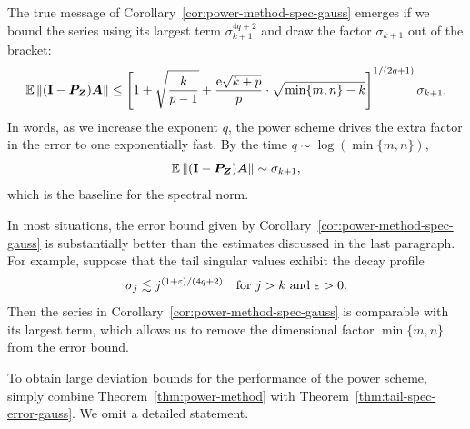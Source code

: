 \documentclass[final]{siamltex}
\newcommand{\notate}[1]{\textcolor{red}{\textbf{[#1]}}}
\begin{document}
\lsp

The true message of Corollary~\ref{cor:power-method-spec-gauss}
emerges if we bound the series using its largest term $\sigma_{k+1}^{4q+2}$
and draw the factor $\sigma_{k+1}$ out of the bracket:
\begin{equation*} \label{eqn:power-method-weak-bd}
\Expect \norm{(\Id - \mtx{P}_{\mtx{Z}}) \mtx{A}}
    \leq \left[ 1 + \sqrt{\frac{k}{p-1}}
    + \frac{\econst\sqrt{k+p}}{p} \cdot \sqrt{ \min\{m,n\} - k } \right]^{1/(2q+1)}
    \sigma_{k+1}.
\end{equation*}
In words, as we increase the exponent $q$, the power scheme drives
the extra factor in the error to one exponentially fast.
By the time $q \sim \log\left( \min\{m,n\} \right)$,
$$
\operatorname{\mathbb{E}} \left\Vert {(\mathbf{I}- \bm{P}_{\bm{Z}}) \bm{A}} \right\Vert
    \sim \sigma_{k+1},
$$
which is the baseline for the spectral norm.

In most situations, the error bound given by Corollary~\ref{cor:power-method-spec-gauss} is substantially better than the estimates discussed in the last paragraph.  For example, suppose that the tail singular values exhibit the decay profile
$$
\sigma_j \lesssim j^{(1+\varepsilon)/(4q+2)}
\quad\text{for $j > k$ and $\varepsilon > 0$}.
$$
Then the series in Corollary~\ref{cor:power-method-spec-gauss} is comparable with its largest term, which allows us to remove the dimensional factor $\min\{m,n\}$ from the error bound.




To obtain large deviation bounds for the performance of the power scheme,
simply combine Theorem~\ref{thm:power-method}
with Theorem~\ref{thm:tail-spec-error-gauss}.
We omit a detailed statement.
\end{document}
